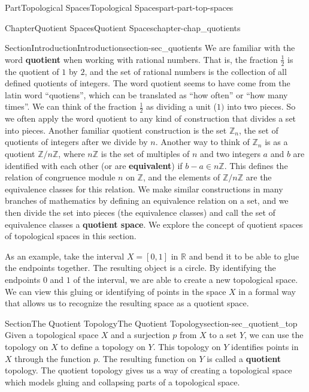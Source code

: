 \documentclass[oneside,10pt,]{book}
\newcommand{\terminology}[1]{\textbf{#1}}
\numberwithin{equation}{chapter}
\newcommand{\Z}{\mathbb{Z}}
\newcommand{\R}{\mathbb{R}}
\begin{document}
\begin{partptx}{Part}{Topological Spaces}{}{Topological Spaces}{}{}{part-part-top-spaces}
\begin{chapterptx}{Chapter}{Quotient Spaces}{}{Quotient Spaces}{}{}{chapter-chap_quotients}
\typeout{************************************************}
%
\begin{sectionptx}{Section}{Introduction}{}{Introduction}{}{}{section-sec_quotients}
We are familiar with the word \terminology{quotient} when working with rational numbers. That is, the fraction \(\frac{1}{2}\) is the quotient of \(1\) by \(2\), and the set of rational numbers is the collection of all defined quotients of integers. The word quotient seems to have come from the latin word ``quotiens'', which can be translated as ``how often'' or ``how many times''. We can think of the fraction \(\frac{1}{2}\) as dividing a unit (\(1)\) into two pieces. So we often apply the word quotient to any kind of construction that divides a set into pieces. Another familiar quotient construction is the set \(\Z_n\), the set of quotients of integers after we divide by \(n\). Another way to think of \(\Z_n\) is as a quotient \(\Z/n\Z\), where \(n\Z\) is the set of multiples of \(n\) and two integers \(a\) and \(b\) are identified with each other (or are \terminology{equivalent}) if \(b-a \in n\Z\). This defines the relation of congruence module \(n\) on \(\Z\), and the elements of \(\Z/n\Z\) are the equivalence classes for this relation. We make similar constructions in many branches of mathematics by defining an equivalence relation on a set, and we then divide the set into pieces (the equivalence classes) and call the set of equivalence classes a \terminology{quotient space}. We explore the concept of quotient spaces of topological spaces in this section.%
\par
As an example, take the interval \(X = [0,1]\) in \(\R\) and bend it to be able to glue the endpoints together. The resulting object is a circle. By identifying the endpoints \(0\) and \(1\) of the interval, we are able to create a new topological space. We can view this gluing or identifying of points in the space \(X\) in a formal way that allows us to recognize the resulting space as a quotient space.%
\end{sectionptx}
%
%
\typeout{************************************************}
\typeout{************************************************}
%
\begin{sectionptx}{Section}{The Quotient Topology}{}{The Quotient Topology}{}{}{section-sec_quotient_top}
Given a topological space \(X\) and a surjection \(p\) from \(X\) to a set \(Y\), we can use the topology on \(X\) to define a topology on \(Y\). This topology on \(Y\) identifies points in \(X\) through the function \(p\). The resulting function on \(Y\) is called a \terminology{quotient} topology. The quotient topology gives us a way of creating a topological space which models gluing and collapsing parts of a topological space.%

\end{sectionptx}
\end{chapterptx}
\end{partptx}
\end{document}

